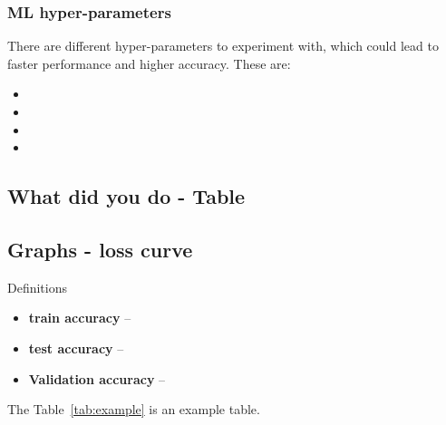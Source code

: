 \documentclass[sigplan,screen]{acmart}
\begin{document}

\subsubsection{ML hyper-parameters}

There are different hyper-parameters to experiment with, which could lead to faster performance and higher accuracy. These are:

\begin{itemize}
    \item 
    \item 
    \item 
    \item
\end{itemize}


\subsection{What did you do - Table}

\subsection{Graphs -  loss curve}

Definitions

\begin{itemize}

\item {\bf train accuracy} -- 

\item {\bf test accuracy} -- 

\item {\bf Validation accuracy} -- 

\end{itemize}

The Table~\ref{tab:example}  is an example table.

\begin{table}[!ht]
    \caption{The best 20 accuracy values sorted by xyz Accuracy with rank 1 representing the best value}
    \label{tab:rank}
    \label{tab:example}
    \centering
\end{table}
\end{document}
